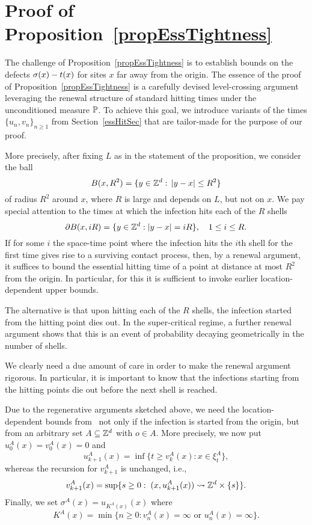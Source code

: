 
\section{Proof of Proposition~\ref{propEssTightness}}

The challenge of Proposition~\ref{propEssTightness} is to establish bounds on the defects $\sigma(x) - \t(x)$ for sites $x$ far away from the origin.
The essence of the proof of Proposition~\ref{propEssTightness} is a carefully devised level-crossing argument leveraging the renewal structure of standard hitting times under the unconditioned measure $\P$. To achieve this goal, we introduce variants of the times $\{u_n, v_n\}_{n\ge1}$ from Section~\ref{essHitSec} that are tailor-made for the purpose of our proof.

More precisely, after fixing $L$ as in the statement of the proposition, we consider the ball 
$$B(x, R^2) = \{y \in \Zd:\, |y - x| \le R^2 \}$$
of radius $R^2$ around $x$, where $R$ is large and depends on $L$, but not on $x$. We pay special attention to the times at which the  infection hits each of the  $R$ shells 
$$\partial B(x,iR) = \{y \in \Zd: |y-x| = iR \},\quad 1\le i \le R. $$
If for some $i$ the space-time point where the infection hits the $i$th shell for the first time gives rise to a surviving contact process, then, by a renewal argument, it suffices to bound the essential hitting time of a point at distance at most $R^2$ from the origin. In particular, for this it is sufficient to invoke earlier location-dependent upper bounds.

The alternative is that upon hitting each of the $R$ shells, the infection started from the hitting point dies out. In the super-critical regime, a further renewal argument shows that this is an event of probability decaying geometrically in the number of shells. 


We clearly need a due amount of care in order to make the renewal argument rigorous. In particular, it is important to know that the infections starting from the hitting points die out before the next shell is reached.

Due to the regenerative arguments sketched above, we need the location-dependent bounds from~\cite[Theorem 15]{GaretMarch14} not only if the infection is started from the origin, but from an arbitrary set $A \subseteq \Zd$ with $o \in A$. More precisely, we now put $u^A_0(x) = v^A_0(x) = 0$ and
\[u^A_{k+1}(x)=\inf\{t\ge v^A_k(x):x\in\xi^A_t\},\]
whereas the recursion for $v^A_{k+1}$ is unchanged, i.e., 
\[v^A_{k+1}(x)=\sup\{s\ge0:\; (x,u^A_{k+1}(x)) \rightsquigarrow \Zd \times \{s\} \}. \]
Finally, we set $\sigma^A(x)=u_{K^A(x)}(x) $ where 
\[K^A(x)=\min\{n\ge0:v^A_n(x)=\infty\text{ or }u^A_n(x)=\infty\}.\]


